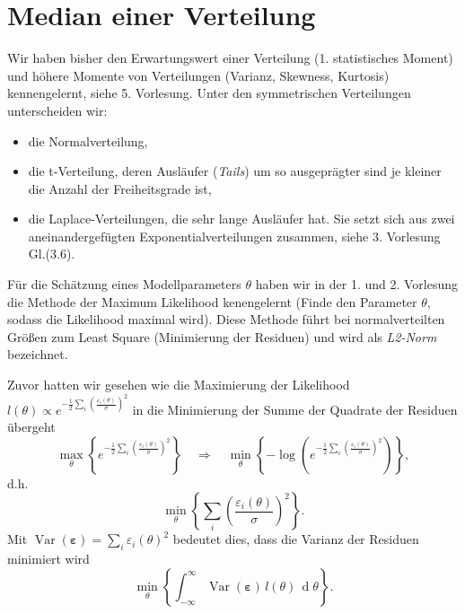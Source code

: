 \section{Median einer Verteilung}
Wir haben bisher den Erwartungswert einer Verteilung (1. statistisches Moment) und höhere Momente von Verteilungen (Varianz, Skewness, Kurtosis) kennengelernt, siehe 5. Vorlesung. Unter den symmetrischen Verteilungen unterscheiden wir: 
\begin{itemize}
	\item die Normalverteilung,
	\item die t-Verteilung, deren Ausläufer (\textit{Tails}) um so ausgeprägter sind je kleiner die Anzahl der Freiheitsgrade ist, 
	\item die Laplace-Verteilungen, die sehr lange Ausläufer hat. Sie 
	setzt sich aus zwei aneinandergefügten Exponentialverteilungen zusammen, siehe
	3. Vorlesung Gl.(3.6).  
\end{itemize}

Für die Schätzung eines Modellparameters $\theta$ haben wir in 
der 1. und 2. Vorlesung die Methode der Maximum Likelihood kenengelernt 
(\glqq Finde den Parameter $\theta$, sodass die Likelihood maximal wird\grqq). Diese Methode führt bei normalverteilten Größen zum Least Square (Minimierung der Residuen) und wird als \textit{L2-Norm} bezeichnet. 

Zuvor hatten wir gesehen wie die Maximierung der Likelihood
$l(\theta) \propto e^{-\frac{1}{2}\sum_i \left(\frac{\varepsilon_i(\theta)}{\sigma}\right)^2}$
in die Minimierung der Summe der Quadrate der Residuen übergeht
$$
\max_{\theta} \left\{ e^{-\frac{1}{2}\sum_i \left(\frac{\varepsilon_i(\theta)}{\sigma}\right)^2} \right\}
\quad \Rightarrow \quad
\min_{\theta} \left\{ -\log\left(e^{-\frac{1}{2}\sum_i \left(\frac{\varepsilon_i(\theta)}{\sigma}\right)^2} \right) \right\} ,
$$
d.h.
$$
\min_{\theta} \left\{ \sum_i \left(\frac{\varepsilon_i(\theta)}{\sigma}\right)^2 \right\} .
$$
Mit $\operatorname{Var}(\boldsymbol \varepsilon) = \sum_i \varepsilon_i(\theta)^2$ bedeutet dies, dass
die Varianz der Residuen minimiert wird
\begin{equation}
\min_{\theta} \left\{ \int_{-\infty}^{\infty} \operatorname{Var}(\boldsymbol \varepsilon)  \, l(\theta) \, \operatorname d \theta \right\} .
\end{equation}

